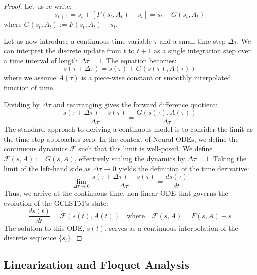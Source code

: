 \documentclass{article}
\theoremstyle{remark}
\theoremstyle{definition}
\newcommand{\dpt}[1]{\frac{d#1}{dt}} %
\begin{document}
\begin{proof}
Let us re-write:
\begin{equation}
    s_{t+1} = s_t + [F(s_t, A_t) - s_t] = s_t + G(s_t, A_t)
\end{equation}
where $G(s_t, A_t) := F(s_t, A_t) - s_t$.

Let us now introduce a continuous time variable $\tau$ and a small time step $\Delta \tau$. We can interpret the discrete update from $t$ to $t+1$ as a single integration step over a time interval of length $\Delta \tau=1$. The equation becomes:
\begin{equation}
    s(\tau + \Delta \tau) = s(\tau) + G(s(\tau), A(\tau))
\end{equation}
where we assume $A(\tau)$ is a piece-wise constant or smoothly interpolated function of time.

Dividing by $\Delta \tau$ and rearranging gives the forward difference quotient:
\begin{equation}
    \frac{s(\tau + \Delta \tau) - s(\tau)}{\Delta \tau} = \frac{G(s(\tau), A(\tau))}{\Delta \tau}
\end{equation}
The standard approach to deriving a continuous model is to consider the limit as the time step approaches zero. In the context of Neural ODEs, we define the continuous dynamics $\mathcal{F}$ such that this limit is well-posed. We define $\mathcal{F}(s, A) := G(s, A)$, effectively scaling the dynamics by $\Delta \tau = 1$.
Taking the limit of the left-hand side as $\Delta \tau \to 0$ yields the definition of the time derivative:
\begin{equation}
    \lim_{\Delta \tau \to 0} \frac{s(\tau + \Delta \tau) - s(\tau)}{\Delta \tau} = \dpt{s(\tau)}
\end{equation}
Thus, we arrive at the continuous-time, non-linear ODE that governs the evolution of the GCLSTM's state:
\begin{equation}
    \dpt{s(t)} = \mathcal{F}(s(t), A(t)) \quad \text{where} \quad \mathcal{F}(s, A) = F(s, A) - s
\end{equation} \label{eq:derived_ode}
The solution to this ODE, $s(t)$, serves as a continuous interpolation of the discrete sequence $\{s_t\}$.
\end{proof}

\subsection{Linearization and Floquet Analysis} \label{seq:step2}
\end{document}
